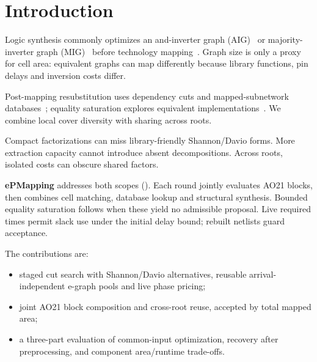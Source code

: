 \section{Introduction}
Logic synthesis commonly optimizes an and-inverter graph (AIG)~\cite{AIG} or majority-inverter graph (MIG)~\cite{MIG,MIG_TCAD} before technology mapping~\cite{calvino2022mapping}. Graph size is only a proxy for cell area: equivalent graphs can map differently because library functions, pin delays and inversion costs differ.

Post-mapping resubstitution uses dependency cuts and mapped-subnetwork databases~\cite{iwls24,aspdac25}; equality saturation explores equivalent implementations~\cite{ustun2022impress,cheng2024seer,coward2024rover,chen2024esyn}. We combine local cover diversity with sharing across roots.

Compact factorizations can miss library-friendly Shannon/Davio forms. More extraction capacity cannot introduce absent decompositions. Across roots, isolated costs can obscure shared factors.

\textbf{ePMapping} addresses both scopes (). Each round jointly evaluates AO21 blocks, then combines cell matching, database lookup and structural synthesis. Bounded equality saturation follows when these yield no admissible proposal. Live required times permit slack use under the initial delay bound; rebuilt netlists guard acceptance.

The contributions are:
\begin{itemize}
 \item staged cut search with Shannon/Davio alternatives, reusable arrival-independent e-graph pools and live phase pricing;
 \item joint AO21 block composition and cross-root reuse, accepted by total mapped area;
 \item a three-part evaluation of common-input optimization, recovery after preprocessing, and component area/runtime trade-offs.
\end{itemize}

